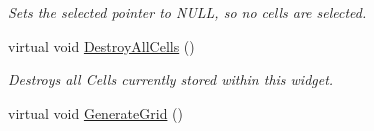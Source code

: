 \begin{DoxyCompactItemize}
\begin{DoxyCompactList}\small\item\em Sets the selected pointer to NULL, so no cells are selected. \item\end{DoxyCompactList}\item 
\hypertarget{classMezzanine_1_1UI_1_1CellGrid_ad820c686b028dd5daeed8548b2f8918a}{
virtual void \hyperlink{classMezzanine_1_1UI_1_1CellGrid_ad820c686b028dd5daeed8548b2f8918a}{DestroyAllCells} ()}
\label{classMezzanine_1_1UI_1_1CellGrid_ad820c686b028dd5daeed8548b2f8918a}

\begin{DoxyCompactList}\small\item\em Destroys all Cells currently stored within this widget. \item\end{DoxyCompactList}\item 
\hypertarget{classMezzanine_1_1UI_1_1CellGrid_a92b5d5a1d709c9e7419c51c6db5a3724}{
virtual void \hyperlink{classMezzanine_1_1UI_1_1CellGrid_a92b5d5a1d709c9e7419c51c6db5a3724}{GenerateGrid} ()}
\label{classMezzanine_1_1UI_1_1CellGrid_a92b5d5a1d709c9e7419c51c6db5a3724}


\end{DoxyCompactItemize}
